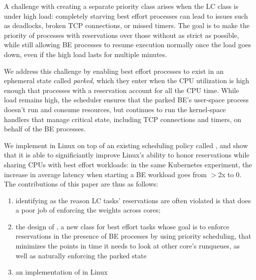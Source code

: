 A challenge with creating a separate priority class arises when the LC class is
under high load: completely starving best effort processes can lead to issues
such as deadlocks, broken TCP connections, or missed timers. The goal is to make
the priority of processes with reservations over those without as strict as
possible, while still allowing BE processes to resume execution normally once
the load goes down, even if the high load lasts for multiple minutes.

We address this challenge by enabling best effort processes to exist in an
ephemeral state called \textit{parked}, which they enter when the CPU
utilization is high enough that processes with a reservation account for all the
CPU time. While load remains high, the scheduler ensures that the parked BE's
user-space process doesn't run and consume resources, but continues to run the
kernel-space handlers that manage critical state, including TCP connections and
timers, on behalf of the BE processes. 

We implement \beclass{} in Linux on top of an existing scheduling policy called
\schedidle{}, and show that it is able to significiantly improve Linux's ability
to honor reservations while sharing CPUs with best effort workloads: in the same
Kubernetes experiment, the increase in average latency when starting a BE
workload goes from $>$2x to 0. The contributions of this paper are thus as
follows: 
\begin{enumerate}
    \item identifying as the reason LC tasks' reservations are often violated is
    that \cgroups{} does a poor job of enforcing the weights across cores;
    \item the design of \beclass{}, a new class for best effort tasks whose goal
    is to enforce reservations in the presence of BE processes by using priority
    scheduling, that minimizes the points in time it needs to look at other
    core's runqueues, as well as naturally enforcing the parked state
    \item an implementation of \beclass{} in Linux
\end{enumerate}
